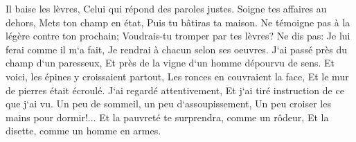 \verse Il baise les lèvres, Celui qui répond des paroles justes. 
\verse Soigne tes affaires au dehors, Mets ton champ en état, Puis tu bâtiras ta maison. 
\verse Ne témoigne pas à la légère contre ton prochain; Voudrais-tu tromper par tes lèvres? 
\verse Ne dis pas: Je lui ferai comme il m`a fait, Je rendrai à chacun selon ses oeuvres. 
\verse J`ai passé près du champ d`un paresseux, Et près de la vigne d`un homme dépourvu de sens. 
\verse Et voici, les épines y croissaient partout, Les ronces en couvraient la face, Et le mur de pierres était écroulé. 
\verse J`ai regardé attentivement, Et j`ai tiré instruction de ce que j`ai vu. 
\verse Un peu de sommeil, un peu d`assoupissement, Un peu croiser les mains pour dormir!... 
\verse Et la pauvreté te surprendra, comme un rôdeur, Et la disette, comme un homme en armes. 

